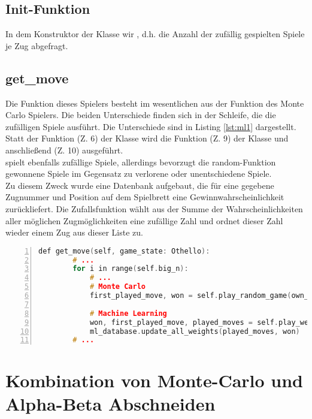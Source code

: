 \subsection*{Init-Funktion}
In dem Konstruktor der Klasse  wir , d.h. die Anzahl der zufällig gespielten Spiele je Zug abgefragt.

\subsection*{get\_move}
Die  Funktion dieses Spielers besteht im wesentlichen aus der Funktion  des Monte Carlo Spielers. Die beiden Unterschiede finden sich in der Schleife, die die zufälligen Spiele ausführt. Die Unterschiede sind in Listing \ref{lst:ml1} dargestellt. 
Statt der Funktion  (Z. 6) der  Klasse wird die Funktion  (Z. 9) der Klasse  und anschließend  (Z. 10) ausgeführt. 
\\ spielt ebenfalls zufällige Spiele, allerdings bevorzugt die random-Funktion gewonnene Spiele im Gegensatz zu verlorene oder unentschiedene Spiele.
\\ Zu diesem Zweck wurde eine Datenbank aufgebaut, die für eine gegebene Zugnummer und Position auf dem Spielbrett eine Gewinnwahrscheinlichkeit zurückliefert. Die Zufallsfunktion wählt aus der Summe der Wahrscheinlichkeiten aller möglichen Zugmöglichkeiten eine zufällige Zahl und ordnet dieser Zahl wieder einem Zug aus dieser Liste zu.

\begin{lstlisting}[caption = {get\_move Funktion des Alpha-Beta Spielers}, language = cpp, captionpos = t , numbers=left, label={lst:ml1}]
    def get_move(self, game_state: Othello):
		# ...
        for i in range(self.big_n): 
			# ... 
			# Monte Carlo
			first_played_move, won = self.play_random_game(own_symbol, simulated_game)

			# Machine Learning
			won, first_played_move, played_moves = self.play_weighted_random_game(own_symbol, simulated_game)
			ml_database.update_all_weights(played_moves, won)
		# ...
\end{lstlisting}

\section{Kombination von Monte-Carlo und Alpha-Beta Abschneiden}
\label{ab_comb}